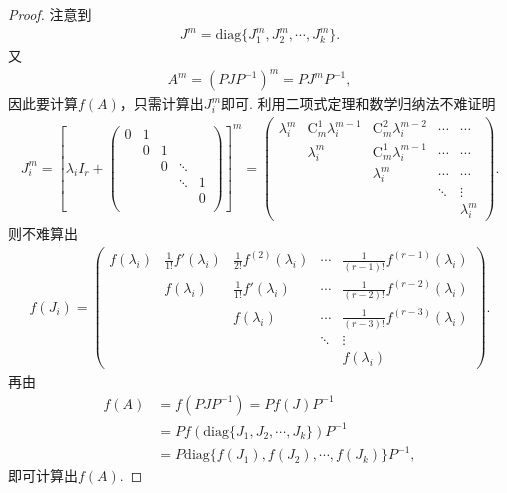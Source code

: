 \documentclass[../../main.tex]{subfiles}
\begin{document}
\begin{proof}
注意到
\begin{align*}
J^m = \mathrm{diag}\{J_1^m,J_2^m,\cdots,J_k^m\}.
\end{align*}
又
\begin{align*}
A^m = (PJP^{-1})^m = PJ^mP^{-1},
\end{align*}
因此要计算\(f(A)\)，只需计算出\(J_i^m\)即可. 
利用二项式定理和数学归纳法不难证明
\begin{align*}
J_{i}^{m}=\left[ \lambda _iI_r+\left( \begin{matrix}
0&		1&		&		&		\\
&		0&		1&		&		\\
&		&		0&		\ddots&		\\
&		&		&		\ddots&		1\\
&		&		&		&		0\\
\end{matrix} \right) \right] ^m=\begin{pmatrix}
\lambda_i^m & \mathrm{C}_m^1\lambda_i^{m - 1} & \mathrm{C}_m^2\lambda_i^{m - 2} & \cdots & \cdots \\
& \lambda_i^m & \mathrm{C}_m^1\lambda_i^{m - 1} & \cdots & \cdots \\
& & \lambda_i^m & \cdots & \cdots \\
& & & \ddots & \vdots \\
& & & & \lambda_i^m
\end{pmatrix}.
\end{align*}
则不难算出
\begin{align*}
f(J_i)= \begin{pmatrix}
f(\lambda_i) & \frac{1}{1!}f'(\lambda_i) & \frac{1}{2!}f^{(2)}(\lambda_i) & \cdots & \frac{1}{(r - 1)!}f^{(r - 1)}(\lambda_i) \\
 & f(\lambda_i) & \frac{1}{1!}f'(\lambda_i) & \cdots & \frac{1}{(r - 2)!}f^{(r - 2)}(\lambda_i) \\
 & & f(\lambda_i) & \cdots & \frac{1}{(r - 3)!}f^{(r - 3)}(\lambda_i) \\
 & & & \ddots & \vdots \\
 & & & & f(\lambda_i)
\end{pmatrix}. 
\end{align*}
再由
\begin{align*}
f(A) &= f(PJP^{-1}) = Pf(J)P^{-1} \\
&= P f(\mathrm{diag}\{J_1,J_2,\cdots,J_k\})P^{-1} \\
&= P \mathrm{diag}\{f(J_1),f(J_2),\cdots,f(J_k)\}P^{-1},
\end{align*}
即可计算出\(f(A)\). 
\end{proof}
\end{document}
